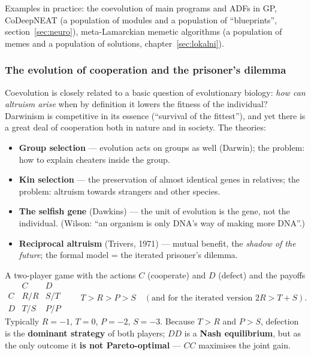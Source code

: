 \documentclass[11pt,a4paper]{article}
\theoremstyle{definition}
\providecommand{\uv}[1]{``#1''}
\begin{document}
Examples in practice: the coevolution of main programs and ADFs in GP,
CoDeepNEAT (a population of modules and a population of \uv{blueprints},
section~\ref{sec:neuro}), meta-Lamarckian memetic algorithms (a population of
memes and a population of solutions, chapter~\ref{sec:lokalni}).

\subsubsection{The evolution of cooperation and the prisoner's dilemma}

Coevolution is closely related to a basic question of evolutionary biology:
\emph{how can altruism arise} when by definition it lowers the fitness of the
individual? Darwinism is competitive in its essence (\uv{survival of the
fittest}), and yet there is a great deal of cooperation both in nature and in
society. The theories:
\begin{itemize}
\item \textbf{Group selection} --- evolution acts on groups as well (Darwin);
  the problem: how to explain cheaters inside the group.
\item \textbf{Kin selection} --- the preservation of almost identical genes in
  relatives; the problem: altruism towards strangers and other species.
\item \textbf{The selfish gene} (Dawkins) --- the unit of evolution is the gene,
  not the individual. (Wilson: \uv{an organism is only DNA's way of making more
  DNA}.)
\item \textbf{Reciprocal altruism} (Trivers, 1971) --- mutual benefit, the
  \emph{shadow of the future}; the formal model = the iterated prisoner's
  dilemma.
\end{itemize}

\begin{defbox}
A two-player game with the actions $C$ (cooperate) and $D$ (defect) and the
payoffs
\[
\begin{array}{c|cc}
 & C & D\\\hline
C & R/R & S/T\\
D & T/S & P/P
\end{array}
\qquad
T > R > P > S \quad (\text{and for the iterated version } 2R > T+S).
\]
Typically $R=-1$, $T=0$, $P=-2$, $S=-3$. Because $T > R$ and $P > S$, defection
is the \textbf{dominant strategy} of both players; $DD$ is a \textbf{Nash
equilibrium}, but as the only outcome it \textbf{is not Pareto-optimal} ---
$CC$ maximises the joint gain.
\end{defbox}
\end{document}
